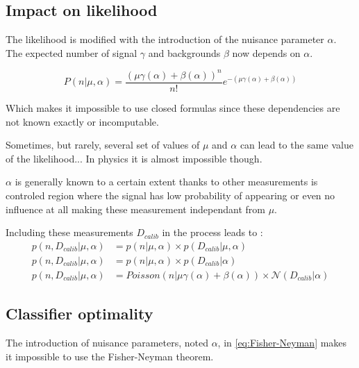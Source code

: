 
\subsection{Impact on likelihood} %
\label{sub:impact_on_likelihood}


The likelihood is modified with the introduction of the nuisance parameter $\alpha$.
The expected number of signal $\gamma$ and backgrounds $\beta$ now depends on $\alpha$.

\begin{equation}
	P(n| \mu, \alpha) = \frac{(\mu \gamma(\alpha) +\beta(\alpha))^n }{n!} e^{-(\mu \gamma(\alpha) +\beta(\alpha))}
\end{equation}

Which makes it impossible to use closed formulas since these dependencies are not known exactly or incomputable.

Sometimes, but rarely, several set of values of $\mu$ and $\alpha$  can lead to the same value of the likelihood...
In physics it is almost impossible though.

$\alpha$ is generally known to a certain extent thanks to other measurements is controled region where the signal has low probability of appearing or even no influence at all making these measurement independant from $\mu$.

Including these measurements $D_{calib}$ in the process leads to :
\begin{align}
	p(n, D_{calib} | \mu, \alpha) &= p(n | \mu, \alpha) \times p(D_{calib} | \mu, \alpha) \\
	p(n, D_{calib} | \mu, \alpha) &= p(n | \mu, \alpha) \times p(D_{calib} | \alpha) \\
	p(n, D_{calib} | \mu, \alpha) &= Poisson(n | \mu \gamma(\alpha) +\beta(\alpha)) \times \mathcal N(D_{calib} | \alpha)
\end{align}



\subsection{Classifier optimality} %
\label{sub:classifier_optimality}


The introduction of nuisance parameters, noted $\alpha$, in \autoref{eq:Fisher-Neyman} makes it impossible to use the Fisher-Neyman theorem.

